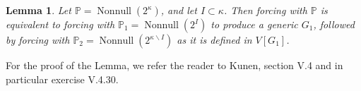 \documentclass[11pt,oneside,a4paper]{amsbook}
\newcommand{\set}[1]{\left\{\,#1\,\right\}}
\newcommand{\PP}{\mathbb P}
\DeclareMathOperator{\Nonnull}{Nonnull}
\theoremstyle{definition}
\theoremstyle{plain}
\newtheorem{lemma}[theorem]{Lemma}
\theoremstyle{definition}
\theoremstyle{remark}
\numberwithin{equation}{section}
\numberwithin{figure}{section}
\begin{document}
%

\begin{lemma}
  Let $\PP=\Nonnull(2^\kappa)$, and let $I\subset\kappa$. Then forcing with $\PP$ is equivalent to forcing with $\PP_1=\Nonnull(2^I)$ to produce a generic $G_1$, followed by forcing with $\PP_2=\Nonnull(2^{\kappa\smallsetminus I})$ as it is defined in $V[G_1]$.
\end{lemma}

For the proof of the Lemma, we refer the reader to Kunen, section V.4 and in particular exercise V.4.30.
\end{document}
